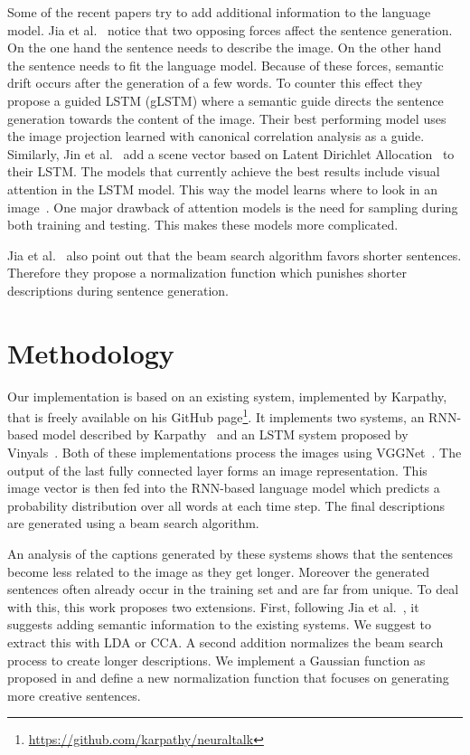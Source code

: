 \documentclass[twoside,twocolumn]{article}
\begin{document}
	Some of the recent papers try to add additional information to the language model. Jia et al.~\cite{Fernando2015} notice that two opposing forces affect the sentence generation. On the one hand the sentence needs to describe the image. On the other hand the sentence needs to fit the language model. Because of these forces, semantic drift occurs after the generation of a few words. To counter this effect they propose a guided LSTM (gLSTM) where a semantic guide directs the sentence generation towards the content of the image. Their best performing model uses the image projection learned with canonical correlation analysis as a guide. 
	Similarly, Jin et al.~\cite{Jin2015} add a scene vector based on Latent Dirichlet Allocation~\cite{Blei2012} to their LSTM.
	The models that currently achieve the best results include visual attention in the LSTM model. This way the model learns where to look in an image~\cite{Jin2015,Xu2015}. One major drawback of attention models is the need for sampling during both training and testing. This makes these models more complicated.
	
	Jia et al.~\cite{Fernando2015} also point out that the beam search algorithm favors shorter sentences. Therefore they propose a normalization function which punishes shorter descriptions during sentence generation.
	
	\section{Methodology}
	\label{sec:methodology}
	Our implementation is based on an existing system, implemented by Karpathy, that is freely available on his GitHub page\footnote{\url{https://github.com/karpathy/neuraltalk}}. It implements two systems, an RNN-based model described by Karpathy~\cite{Karpathy2015} and an LSTM system proposed by Vinyals~\cite{Google}. Both of these implementations process the images using VGGNet~\cite{Arge2015}. The output of the last fully connected layer forms an image representation. This image vector is then fed into the RNN-based language model which predicts a probability distribution over all words at each time step. The final descriptions are generated using a beam search algorithm.
	
	An analysis of the captions generated by these systems shows that the sentences become less related to the image as they get longer. Moreover the generated sentences often already occur in the training set and are far from unique. To deal with this, this work proposes two extensions. First, following Jia et al.~\cite{Fernando2015}, it suggests adding semantic information to the existing systems. We suggest to extract this with LDA or CCA. A second addition normalizes the beam search process to create longer descriptions. We implement a Gaussian function as proposed in \cite{Fernando2015} and define a new normalization function that focuses on generating more creative sentences.
	
\end{document}
